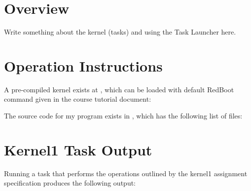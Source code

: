 \documentclass[pdftex,10pt,a4paper]{article}
\begin{document}

\section*{Overview}

Write something about the kernel (tasks) and using the Task Launcher here.

\section*{Operation Instructions}

A pre-compiled kernel exists at
, which can be loaded with
default RedBoot command given in the course tutorial document:

\begin{center}
\end{center}

The source code for my program exists in ,
which has the following list of files:

\newpage
\section*{Kernel1 Task Output}

Running a task that performs the operations outlined by the kernel1 assignment
specification produces the following output:


\end{document}
